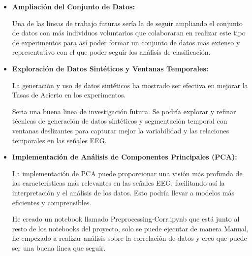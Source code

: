 \begin{itemize}
	
	\item
	\textbf{Ampliación del Conjunto de Datos:}
	
	Una de las lineas de trabajo futuras sería la de seguir ampliando el conjunto de datos con más individuos voluntarios que colaboraran en realizar este tipo de experimentos para así poder formar un conjunto de datos mas extenso y representativo con el que poder seguir los análisis de clasificación.
	
	\item
	\textbf{Exploración de Datos Sintéticos y Ventanas Temporales:}
	
	La generación y uso de datos sintéticos ha mostrado ser efectiva en mejorar la Tasas de Acierto en los experimentos.
	
	Seria una buena linea de investigación futura. Se podría explorar y refinar técnicas de generación de datos sintéticos y segmentación temporal con ventanas deslizantes para capturar mejor la variabilidad y las relaciones temporales en las señales EEG.
	
	\item
	\textbf{Implementación de Análisis de Componentes Principales (PCA):}

	La implementación de PCA puede proporcionar una visión más profunda de las características más relevantes en las señales EEG, facilitando así la interpretación y el análisis de los datos. 
	Esto podría llevar a modelos más eficientes y comprensibles.	
	
	He creado un notebook llamado Preprocessing-Corr.ipynb que está junto al resto de los notebooks del proyecto, solo se puede ejecutar de manera Manual, he empezado a realizar análisis sobre la correlación de datos y creo que puede ser una buena linea que seguir.
	
	
	
\end{itemize}	